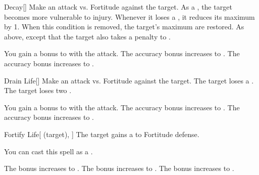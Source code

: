 \lowercase{\hypertarget{spell:Decay}{}}\label{spell:Decay}
\begin{freeability}[Rank 1]{\hypertarget{spell:Decay}{Decay}}[]
Make an attack vs. Fortitude against the target.
\hit As a , the target becomes more vulnerable to injury.
Whenever it loses a , it reduces its maximum  by 1.
When this condition is removed, the target's maximum  are restored.
\crit As above, except that the target also takes a  penalty to .

\rankline
{} You gain a  bonus to  with the attack.
 The accuracy bonus increases to .
 The accuracy bonus increases to .
\end{freeability}
\vspace{0.25em}



\lowercase{\hypertarget{spell:Drain Life}{}}\label{spell:Drain Life}
\begin{freeability}[Rank 1]{\hypertarget{spell:Drain Life}{Drain Life}}[]
Make an attack vs. Fortitude against the target.
\hit The target loses a .
\crit The target loses two .

\rankline
{} You gain a  bonus to  with the attack.
 The accuracy bonus increases to .
 The accuracy bonus increases to .
\end{freeability}
\vspace{0.25em}



\lowercase{\hypertarget{spell:Fortify Life}{}}\label{spell:Fortify Life}
\begin{attuneability}[Rank 1]{\hypertarget{spell:Fortify Life}{Fortify Life}}[ (target), ]
The target gains a   to Fortitude defense.

You can cast this spell as a .

\rankline
{} The bonus increases to .
 The bonus increases to .
 The bonus increases to .
\end{attuneability}
\vspace{0.25em}




